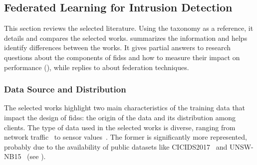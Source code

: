 \subsection{Federated Learning for Intrusion Detection\label{sec:sota.quali.fids}}

This section reviews the selected literature.
Using the taxonomy as a reference, it details and compares the selected works.
 summarizes the information and helps identify differences between the works.
It gives partial answers to research questions about the components of \glspl{fids} and how to measure their impact on performance (), while  replies to  about federation techniques.


\begin{table}
  \centering
  \caption{
    Comparative overview of selected works in the original study---approach and objectives (1/2).%
    \label{tbl:sota.comp}%
  }%
  \resizebox{\textwidth}{!}{}
\end{table}



\subsubsection{Data Source and Distribution\label{sec:sota.quali.data}}

The selected works highlight two main characteristics of the training data that impact the design of \glspl{fids}: the origin of the data and its distribution among clients.
The type of data used in the selected works is diverse, ranging from network traffic~\cite{chen_Networkanomalydetection_2020,rathore_BlockSecIoTNetBlockchainbaseddecentralized_2019} to sensor values~\cite{zhang_BlockchainbasedFederatedLearning_2020,schneble_Attackdetectionusing_2019}.
The former is significantly more represented, probably due to the availability of public datasets like CICIDS2017~\cite{sharafaldin_GeneratingNewIntrusion_2018} and UNSW-NB15~\cite{moustafa_UNSWNB15comprehensivedata_2015} (see ).


